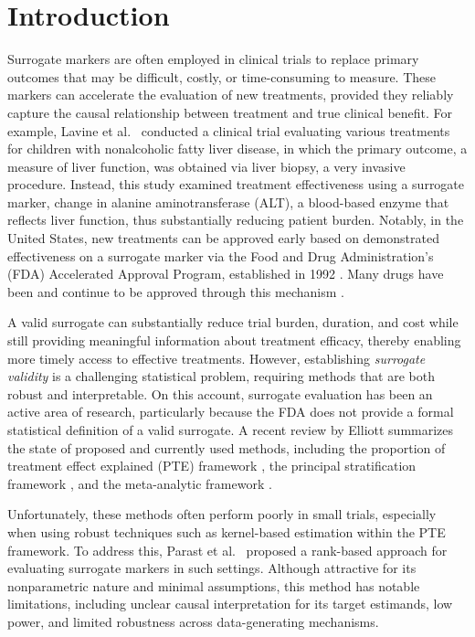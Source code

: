 \documentclass[12pt]{article}
\begin{document}
\newpage


\section{Introduction}\label{sec:introduction}



Surrogate markers are often employed in clinical trials to replace primary outcomes that may be difficult, costly, or time-consuming to measure. These markers can accelerate the evaluation of new treatments, provided they reliably capture the causal relationship between treatment and true clinical benefit. For example, Lavine et al.\ \citep{lavine2010treatment} conducted a clinical trial evaluating various treatments for children with nonalcoholic fatty liver disease, in which the primary outcome, a measure of liver function, was obtained via liver biopsy, a very invasive procedure. Instead, this study examined treatment effectiveness using a surrogate marker, change in alanine aminotransferase (ALT), a blood-based enzyme that reflects liver function, thus substantially reducing patient burden. Notably, in the United States, new treatments can be approved early based on demonstrated effectiveness on a surrogate marker via the Food and Drug Administration's (FDA) Accelerated Approval Program, established in 1992 \citep{FDA_AcceleratedApprovalProgram2024}. Many drugs have been and continue to be approved through this mechanism \citep{FDA_approved}.

A valid surrogate can substantially reduce trial burden, duration, and cost while still providing meaningful information about treatment efficacy, thereby enabling more timely access to effective treatments. However, establishing \textit{surrogate validity} is a challenging statistical problem, requiring methods that are both robust and interpretable. On this account, surrogate evaluation has been an active area of research, particularly because the FDA does not provide a formal statistical definition of a valid surrogate. A recent review by Elliott \citep{elliott2023surrogate} summarizes the state of proposed and currently used methods, including the proportion of treatment effect explained (PTE) framework \citep{freedman1992statistical,wang2002measure,parast2015robust,parast2025surrogate}, the principal stratification framework \citep{frangakis2002principal,gilbert2008evaluating}, and the meta-analytic framework \citep{buyse1998criteria,burzykowski2005evaluation,huang2011comparing}.

Unfortunately, these methods often perform poorly in small trials, especially when using robust techniques such as kernel-based estimation within the PTE framework. To address this, Parast et al.\ \citep{parast2024rank} proposed a rank-based approach for evaluating surrogate markers in such settings. Although attractive for its nonparametric nature and minimal assumptions, this method has notable limitations, including unclear causal interpretation for its target estimands, low power, and limited robustness across data-generating mechanisms.
\end{document}
